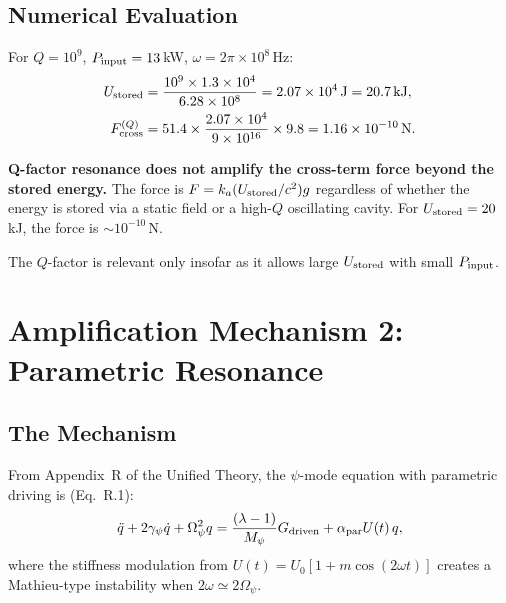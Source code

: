 \documentclass[11pt]{article}
\newcommand{\ka}{k_a}
\begin{document}
\subsection{Numerical Evaluation}

For $Q = 10^9$, $P_{\rm input} = 13$\,kW, $\omega = 2\pi \times 10^8$\,Hz:
\begin{align}
U_{\rm stored} &= \frac{10^9 \times 1.3 \times 10^4}{6.28 \times 10^8}
  = 2.07 \times 10^4\,\text{J} = 20.7\,\text{kJ}, \\
F_{\rm cross}^{(Q)} &= 51.4 \times \frac{2.07 \times 10^4}{9 \times 10^{16}}
  \times 9.8 = 1.16 \times 10^{-10}\,\text{N}.
\end{align}

\begin{tcolorbox}[colback=red!5!white, colframe=red!50!black, title=Q-Factor Verdict]
\textbf{Q-factor resonance does not amplify the cross-term force
beyond the stored energy.} The force is $F = \ka(U_{\rm stored}/c^2)g$
regardless of whether the energy is stored via a static field or a
high-$Q$ oscillating cavity. For $U_{\rm stored} = 20$\,kJ, the force
is $\sim 10^{-10}$\,N.

The $Q$-factor is relevant only insofar as it allows large $U_{\rm stored}$
with small $P_{\rm input}$.
\end{tcolorbox}


\section{Amplification Mechanism 2: Parametric Resonance}\label{sec:parametric}

\subsection{The Mechanism}

From Appendix~R of the Unified Theory, the $\psi$-mode equation with
parametric driving is (Eq.~R.1):
\begin{equation}\label{eq:mode-eq}
\ddot{q} + 2\gamma_\psi\dot{q} + \Omega_\psi^2 q
  = \frac{(\lambda - 1)}{M_\psi}G_{\rm driven}
  + \alpha_{\rm par} U(t)\,q,
\end{equation}
where the stiffness modulation from $U(t) = U_0[1 + m\cos(2\omega t)]$
creates a Mathieu-type instability when $2\omega \simeq 2\Omega_\psi$.
\end{document}
